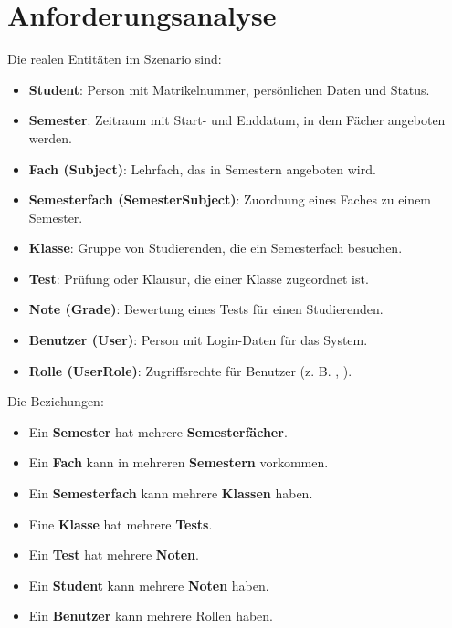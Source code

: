 \documentclass[12pt,a4paper]{article}
\newcommand{\code}[1]{\texttt{\detokenize{#1}}}
\begin{document}
    \section{Anforderungsanalyse}
    Die realen Entitäten im Szenario sind:

    \begin{itemize}
        \item \textbf{Student}: Person mit Matrikelnummer, persönlichen Daten und Status.
        \item \textbf{Semester}: Zeitraum mit Start- und Enddatum, in dem Fächer angeboten werden.
        \item \textbf{Fach (Subject)}: Lehrfach, das in Semestern angeboten wird.
        \item \textbf{Semesterfach (SemesterSubject)}: Zuordnung eines Faches zu einem Semester.
        \item \textbf{Klasse}: Gruppe von Studierenden, die ein Semesterfach besuchen.
        \item \textbf{Test}: Prüfung oder Klausur, die einer Klasse zugeordnet ist.
        \item \textbf{Note (Grade)}: Bewertung eines Tests für einen Studierenden.
        \item \textbf{Benutzer (User)}: Person mit Login-Daten für das System.
        \item \textbf{Rolle (UserRole)}: Zugriffsrechte für Benutzer (z. B. \code{ADMIN}, \code{USER}).
    \end{itemize}

    Die Beziehungen:
    \begin{itemize}
        \item Ein \textbf{Semester} hat mehrere \textbf{Semesterfächer}.
        \item Ein \textbf{Fach} kann in mehreren \textbf{Semestern} vorkommen.
        \item Ein \textbf{Semesterfach} kann mehrere \textbf{Klassen} haben.
        \item Eine \textbf{Klasse} hat mehrere \textbf{Tests}.
        \item Ein \textbf{Test} hat mehrere \textbf{Noten}.
        \item Ein \textbf{Student} kann mehrere \textbf{Noten} haben.
        \item Ein \textbf{Benutzer} kann mehrere Rollen haben.
    \end{itemize}
\end{document}
